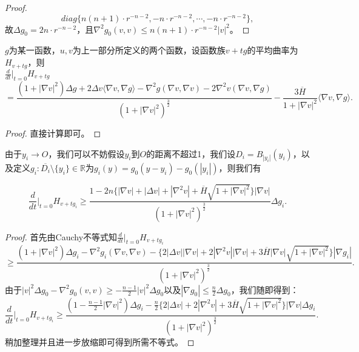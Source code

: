 \begin{enumerate}
\begin{proof}
\begin{displaymath}
diag\{n(n+1)\cdot r^{-n-2},-n\cdot r^{-n-2},\cdots,-n\cdot r^{-n-2}\},
\end{displaymath}
故$\Delta g_{0}=2n\cdot r^{-n-2}$，且$\nabla^{2}g_{0}(v,v)\leq n(n+1)\cdot r^{-n-2}|v|^{2}$。
\end{proof}
\begin{lemma}
$g$为某一函数，$u,v$为上一部分所定义的两个函数，设函数族$v+tg$的平均曲率为$H_{v+tg}$，则\\
$\frac{d}{dt}|_{t=0}H_{v+tg}$
\begin{displaymath}
=\frac{(1+|\nabla v|^{2})\Delta g+2\Delta v\langle\nabla v,\nabla g\rangle-\nabla^{2}g(\nabla v,\nabla v)-2\nabla^{2}v(\nabla v,\nabla g)}{(1+|\nabla v|^{2})^{\frac{3}{2}}}-\frac{3\overline{H}}{1+|\nabla v|^{2}}\langle\nabla v,\nabla g\rangle.
\end{displaymath}
\end{lemma}
\begin{proof}
直接计算即可。
\end{proof}
由于$y_{i}\rightarrow O$，我们可以不妨假设$y_{i}$到$O$的距离不超过1，我们设$D_{i}=B_{|y_{i}|}(y_{i})$，以及定义$g_{i}:\overline{D_{i}}\setminus\{y_{i}\}\in\mathbb{R}$为$g_{i}(y)=g_{0}(y-y_{i})-g_{0}(|y_{i}|)$，则我们有
\begin{theorem}
\begin{displaymath}
\frac{d}{dt}|_{t=0}H_{v+tg_{i}}\geq\frac{1-2n\{|\nabla v|+|\Delta v|+|\nabla^{2}v|+\overline{H}\sqrt{1+|\nabla v|^{2}}\}|\nabla v|}{(1+|\nabla v|^{2})^{\frac{3}{2}}}\Delta g_{i}.
\end{displaymath}
\end{theorem}
\begin{proof}
首先由Cauchy不等式知$\frac{d}{dt}|_{t=0}H_{v+tg_{i}}$
\begin{displaymath}
\geq\frac{(1+|\nabla v|^{2})\Delta g_{i}-\nabla^{2}g_{i}(\nabla v,\nabla v)-\{2|\Delta v||\nabla v|+2|\nabla^{2}v||\nabla v|+3\overline{H}|\nabla v|\sqrt{1+|\nabla v|^{2}}\}|\nabla g_{i}|}{(1+|\nabla v|^{2})^{\frac{3}{2}}}.
\end{displaymath}
由于$|v|^{2}\Delta g_{0}-\nabla^{2}g_{0}(v,v)\geq -\frac{n-1}{2}|v|^{2}\Delta g_{0}$以及$|\nabla g_{0}|\leq \frac{n}{2}\Delta g_{0}$，我们随即得到：
\begin{displaymath}
\frac{d}{dt}|_{t=0}H_{v+tg_{i}}\geq\frac{(1-\frac{n-1}{2}|\nabla v|^{2})\Delta g_{i}-\frac{n}{2}\{2|\Delta v|+2|\nabla^{2}v|+3\overline{H}\sqrt{1+|\nabla v|^{2}}\}|\nabla v|\Delta g_{i}}{(1+|\nabla v|^{2})^{\frac{3}{2}}}.
\end{displaymath}
稍加整理并且进一步放缩即可得到所需不等式。

\end{proof}
\end{enumerate}
